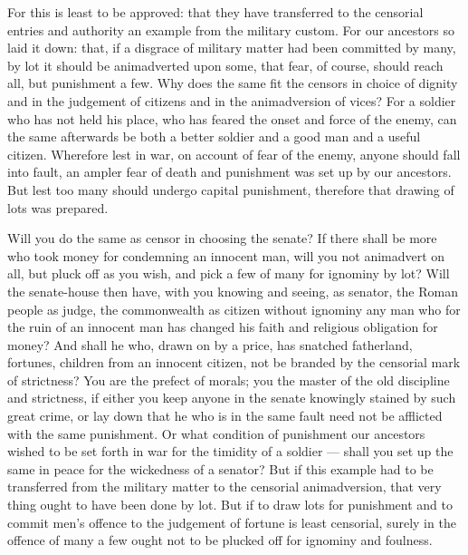  For this is least to be approved: that they have transferred to the censorial entries and authority an example from the military custom. For our ancestors so laid it down: that, if a disgrace of military matter had been committed by many, by lot it should be animadverted upon some, that fear, of course, should reach all, but punishment a few. Why does the same fit the censors in choice of dignity and in the judgement of citizens and in the animadversion of vices? For a soldier who has not held his place, who has feared the onset and force of the enemy, can the same afterwards be both a better soldier and a good man and a useful citizen. Wherefore lest in war, on account of fear of the enemy, anyone should fall into fault, an ampler fear of death and punishment was set up by our ancestors. But lest too many should undergo capital punishment, therefore that drawing of lots was prepared.

 Will you do the same as censor in choosing the senate? If there shall be more who took money for condemning an innocent man, will you not animadvert on all, but pluck off as you wish, and pick a few of many for ignominy by lot? Will the senate-house then have, with you knowing and seeing, as senator, the Roman people as judge, the commonwealth as citizen without ignominy any man who for the ruin of an innocent man has changed his faith and religious obligation for money? And shall he who, drawn on by a price, has snatched fatherland, fortunes, children from an innocent citizen, not be branded by the censorial mark of strictness? You are the prefect of morals; you the master of the old discipline and strictness, if either you keep anyone in the senate knowingly stained by such great crime, or lay down that he who is in the same fault need not be afflicted with the same punishment. Or what condition of punishment our ancestors wished to be set forth in war for the timidity of a soldier --- shall you set up the same in peace for the wickedness of a senator? But if this example had to be transferred from the military matter to the censorial animadversion, that very thing ought to have been done by lot. But if to draw lots for punishment and to commit men's offence to the judgement of fortune is least censorial, surely in the offence of many a few ought not to be plucked off for ignominy and foulness.


